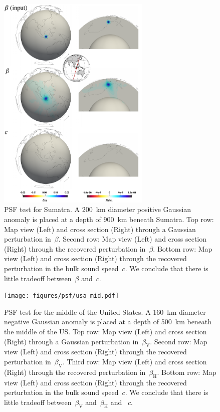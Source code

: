 \documentclass[extra,mreferee]{gji}
\begin{document}
\begin{figure}
  \centering
  \includegraphics[width=0.65\textwidth]{figures/psf/su.pdf}
  \caption{\small{PSF test for Sumatra.
    A 200~km diameter positive Gaussian anomaly is placed at a depth of 900~km beneath Sumatra.
  Top row: Map view (Left) and cross section (Right) through a Gaussian perturbation in~$\beta$.
  Second row: Map view (Left) and cross section (Right) through the recovered perturbation in~$\beta$.
  Bottom row: Map view (Left) and cross section (Right) through the recovered perturbation in the bulk sound speed~$c$. We conclude that there is little tradeoff between~$\beta$ and~$c$.
  }}
  \label{fig:psf_su}
\end{figure}

\begin{figure}
  \centering
  \texttt{[image: figures/psf/usa\_mid.pdf]}
  \caption{\small{PSF test for the middle of the United States.
    A 160~km diameter negative Gaussian anomaly is placed at a depth of 500~km beneath the middle of the US.
  Top row: Map view (Left) and cross section (Right) through a Gaussian perturbation in~$\beta_\mathrm{V}$.
  Second row: Map view (Left) and cross section (Right) through the recovered perturbation in~$\beta_\mathrm{V}$.
  Third row: Map view (Left) and cross section (Right) through the recovered perturbation in~$\beta_\mathrm{H}$.
  Bottom row: Map view (Left) and cross section (Right) through the recovered perturbation in the bulk sound speed~$c$. We conclude that there is little tradeoff between~$\beta_\mathrm{V}$ and~$\beta_\mathrm{H}$ and ~$c$.
  }}
  \label{fig:psf_usa_mid}
\end{figure}
\end{document}
